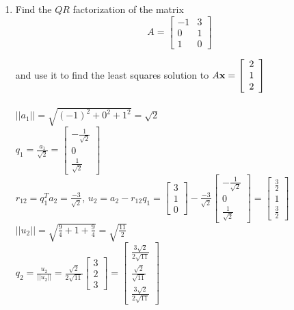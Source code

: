 \documentclass{article}
\begin{document}
{{\begin{enumerate}
\newpage\item Find the $QR$ factorization of the matrix
$$A= \left[
\begin{array}{cc}
-1 & 3 \\
0 & 1 \\
1 & 0 
\end{array} \right] $$ 

and use it to find the least squares solution to $A{\bf x}=\left[\begin{array}{c}
2\\
1\\
2\\
\end{array}\right]$
\\
\\$||a_1||=\sqrt{(-1)^2+0^2+1^2}=\sqrt{2}$
\\$q_1=\frac{a_1}{\sqrt{2}}=\left[\begin{array}{c}-\frac{1}{\sqrt{2}}\\0\\\frac{1}{\sqrt{2}}\end{array}\right]$
\\$r_{12}=q_1^Ta_2=\frac{-3}{\sqrt{2}}$, $u_2=a_2-r_{12}q_1=\left[\begin{array}{c}3\\1\\0\end{array}\right]-\frac{-3}{\sqrt{2}}\left[\begin{array}{c}-\frac{1}{\sqrt{2}}\\0\\\frac{1}{\sqrt{2}}\end{array}\right]=\left[\begin{array}{c}\frac{3}{2}\\1\\\frac{3}{2}\end{array}\right]$
\\$||u_2||=\sqrt{\frac{9}{4}+1+\frac{9}{4}}=\sqrt{\frac{11}{2}}$
\\$q_2=\frac{u_2}{||u_2||}=\frac{\sqrt{2}}{2\sqrt{11}}\left[\begin{array}{c}3\\2\\3\end{array}\right]=\left[\begin{array}{c}\frac{3\sqrt{2}}{2\sqrt{11}}\\\frac{\sqrt{2}}{\sqrt{11}}\\\frac{3\sqrt{2}}{2\sqrt{11}}\end{array}\right]$

\end{enumerate}}}
\end{document}
